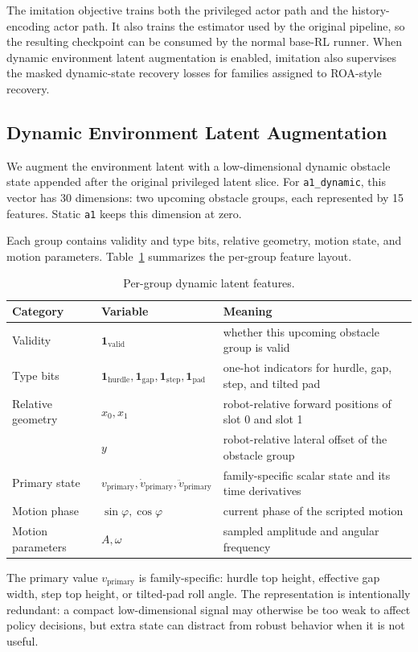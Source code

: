 \documentclass[conference]{IEEEtran}
\begin{document}
The imitation objective trains both the privileged actor path and the history-encoding actor path. It also trains the estimator used by the original pipeline, so the resulting checkpoint can be consumed by the normal base-RL runner. When dynamic environment latent augmentation is enabled, imitation also supervises the masked dynamic-state recovery losses for families assigned to ROA-style recovery.

\subsection{Dynamic Environment Latent Augmentation}
We augment the environment latent with a low-dimensional dynamic obstacle state appended after the original privileged latent slice. For \texttt{a1\_dynamic}, this vector has 30 dimensions: two upcoming obstacle groups, each represented by 15 features. Static \texttt{a1} keeps this dimension at zero.

Each group contains validity and type bits, relative geometry, motion state, and motion parameters. Table~\ref{tab:dynamic_latent_features} summarizes the per-group feature layout.
\begin{table}[htb]
	\caption{Per-group dynamic latent features.}
	\label{tab:dynamic_latent_features}
	\centering
	\begin{tabular}{lll}
		\toprule
		Category & Variable & Meaning \\
		\midrule
		Validity & \(\mathbf 1_{\mathrm{valid}}\) & whether this upcoming obstacle group is valid \\
		Type bits & \(\mathbf 1_{\mathrm{hurdle}}, \mathbf 1_{\mathrm{gap}}, \mathbf 1_{\mathrm{step}}, \mathbf 1_{\mathrm{pad}}\) & one-hot indicators for hurdle, gap, step, and tilted pad \\
		Relative geometry & \(x_0, x_1\) & robot-relative forward positions of slot 0 and slot 1 \\
		& \(y\) & robot-relative lateral offset of the obstacle group \\
		Primary state & \(v_{\mathrm{primary}}, \dot{v}_{\mathrm{primary}}, \ddot{v}_{\mathrm{primary}}\) & family-specific scalar state and its time derivatives \\
		Motion phase & \(\sin\varphi, \cos\varphi\) & current phase of the scripted motion \\
		Motion parameters & \(A, \omega\) & sampled amplitude and angular frequency \\
		\bottomrule
	\end{tabular}
\end{table}
The primary value \(v_{\mathrm{primary}}\) is family-specific: hurdle top height, effective gap width, step top height, or tilted-pad roll angle. The representation is intentionally redundant: a compact low-dimensional signal may otherwise be too weak to affect policy decisions, but extra state can distract from robust behavior when it is not useful.
\end{document}
